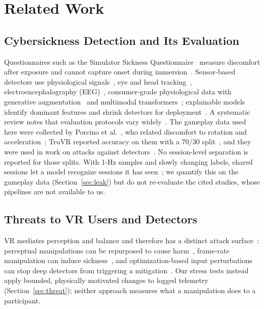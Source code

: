 \section{Related Work}
\label{sec:related}

\subsection{Cybersickness Detection and Its Evaluation}
Questionnaires such as the Simulator Sickness Questionnaire~\cite{kennedy1993ssq} measure discomfort after exposure and cannot capture onset during immersion~\cite{caserman2021cybersickness}. Sensor-based detectors use physiological signals~\cite{dennison2016physio,islam2020automatic}, eye and head tracking~\cite{islam2021fusion}, electroencephalography (EEG)~\cite{liu2024cnneca}, consumer-grade physiological data with generative augmentation~\cite{yalcin2024automatic} and multimodal transformers~\cite{jeong2024precyse}; explainable models identify dominant features and shrink detectors for deployment~\cite{kundu2022truvr,kundu2023litevr,kundu2023vrlens}. A systematic review notes that evaluation protocols vary widely~\cite{yang2022mlreview}. The gameplay data used here were collected by Porcino et al.~\cite{porcino2021methodology,porcino2019uffcsdata}, who related discomfort to rotation and acceleration~\cite{porcino2022identifying}; TruVR reported  accuracy on them with a 70/30 split~\cite{kundu2022truvr}, and they were used in work on attacks against detectors~\cite{kundu2025securing}. No session-level separation is reported for those splits. With 1-Hz samples and slowly changing labels, shared sessions let a model recognize sessions it has seen~\cite{kapoor2023leakage,kaufman2012leakage,roberts2017cv}; we quantify this on the gameplay data (Section~\ref{sec:leak}) but do not re-evaluate the cited studies, whose pipelines are not available to us.

\subsection{Threats to VR Users and Detectors}
VR mediates perception and balance and therefore has a distinct attack surface~\cite{odeleye2023virtually,giaretta2025security}: perceptual manipulations can be repurposed to cause harm~\cite{tseng2022dark,cheng2023perceptual}, frame-rate manipulation can induce sickness~\cite{odeleye2021framerate}, and optimization-based input perturbations can stop deep detectors from triggering a mitigation~\cite{kundu2025securing,ahmed2025adversarialvr}. Our stress tests instead apply bounded, physically motivated changes to logged telemetry (Section~\ref{sec:threat}); neither approach measures what a manipulation does to a participant.

